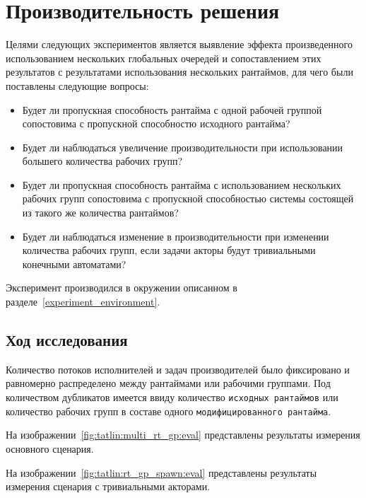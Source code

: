 \section{Производительность решения}

Целями следующих экспериментов является выявление эффекта произведенного использованием нескольких глобальных очередей и сопоставлением этих результатов с результатами использования нескольких рантаймов, для чего были поставлены следующие вопросы:

\begin{itemize}\label{quest}
    \item Будет ли пропускная способность рантайма с одной рабочей группой сопостовима с пропускной способностю исходного рантайма?
    \item Будет ли наблюдаться увеличение производительности при использовании большего количества рабочих групп?
    \item Будет ли пропускная способность рантайма с использованием нескольких рабочих групп сопостовима с пропускной способностью системы состоящей из такого же количества рантаймов?
    \item Будет ли наблюдаться изменение в производительности при изменении количества рабочих групп, если задачи акторы будут тривиальными конечными автоматами?
\end{itemize}

Эксперимент производился в окружении описанном в разделе~\ref{experiment_environment}.

\subsection{Ход исследования}

Количество потоков исполнителей и задач производителей было фиксировано и равномерно распределено между рантаймами или рабочими группами. Под количеством дубликатов имеется ввиду количество \verb|исходных рантаймов| или количество рабочих групп в составе одного \verb|модифицированного рантайма|.

На изображении~\ref{fig:tatlin:multi_rt_gp:eval} представлены результаты измерения основного сценария.

На изображении~\ref{fig:tatlin:rt_gp_spawn:eval} представлены результаты измерения сценария с тривиальными акторами.

